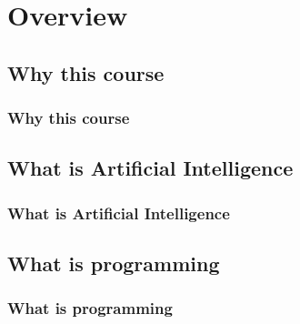 



\begin{frame}
   \titlepage
\end{frame}



\begin{frame}
   \tableofcontents
\end{frame}

\section{Overview}


\subsection{Why this course}
\begin{frame}\frametitle{Why this course}

\end{frame}


\subsection{What is Artificial Intelligence}
\begin{frame}\frametitle{What is Artificial Intelligence}

\end{frame}


\subsection{What is programming}
\begin{frame}\frametitle{What is programming}

\end{frame}



